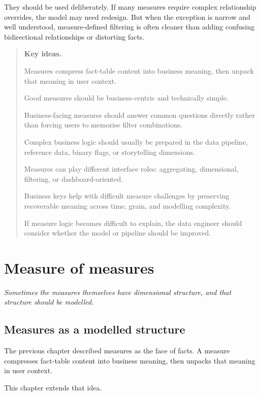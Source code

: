 \documentclass[10pt,openany,10pt]{book}
\begin{document}
They should be used deliberately. If many measures require complex
relationship overrides, the model may need redesign. But when the
exception is narrow and well understood, measure-defined filtering is
often cleaner than adding confusing bidirectional relationships or
distorting facts.

\begin{quote}
\textbf{Key ideas.}

Measures compress fact-table content into business meaning, then unpack
that meaning in user context.

Good measures should be business-centric and technically simple.

Business-facing measures should answer common questions directly rather
than forcing users to memorise filter combinations.

Complex business logic should usually be prepared in the data pipeline,
reference data, binary flags, or storytelling dimensions.

Measures can play different interface roles: aggregating, dimensional,
filtering, or dashboard-oriented.

Business keys help with difficult measure challenges by preserving
recoverable meaning across time, grain, and modelling complexity.

If measure logic becomes difficult to explain, the data engineer should
consider whether the model or pipeline should be improved.
\end{quote}

\newpage

\chapter{Measure of
measures}\label{docs-presenting-insights-measure-of-measures}

\emph{Sometimes the measures themselves have dimensional structure, and
that structure should be modelled.}

\section{Measures as a modelled
structure}\label{measures-as-a-modelled-structure}

The previous chapter described measures as the face of facts. A measure
compresses fact-table content into business meaning, then unpacks that
meaning in user context.

This chapter extends that idea.
\end{document}
